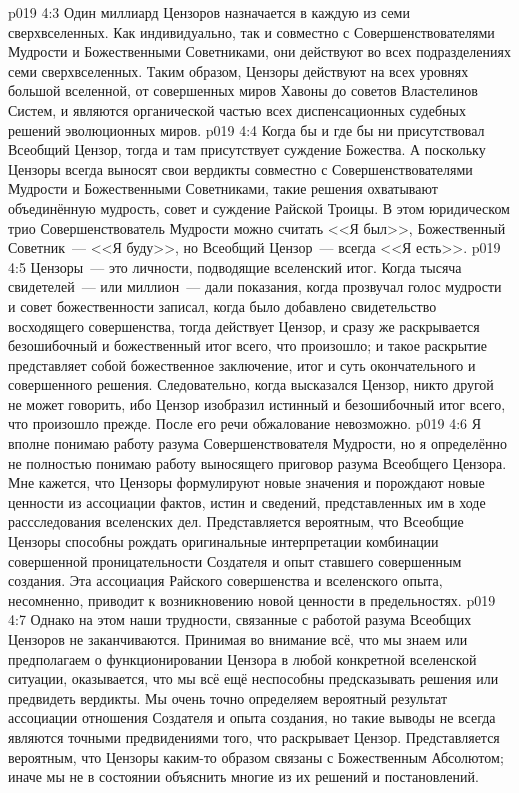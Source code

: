 \vs p019 4:3 Один миллиард Цензоров назначается в каждую из семи сверхвселенных. Как индивидуально, так и совместно с Совершенствователями Мудрости и Божественными Советниками, они действуют во всех подразделениях семи сверхвселенных. Таким образом, Цензоры действуют на всех уровнях большой вселенной, от совершенных миров Хавоны до советов Властелинов Систем, и являются органической частью всех диспенсационных судебных решений эволюционных миров.
\vs p019 4:4 \pc Когда бы и где бы ни присутствовал Всеобщий Цензор, тогда и там присутствует суждение Божества. А поскольку Цензоры всегда выносят свои вердикты совместно с Совершенствователями Мудрости и Божественными Советниками, такие решения охватывают объединённую мудрость, совет и суждение Райской Троицы. В этом юридическом трио Совершенствователь Мудрости можно считать <<Я был>>, Божественный Советник~--- <<Я буду>>, но Всеобщий Цензор~--- всегда <<Я есть>>.
\vs p019 4:5 \pc Цензоры~--- это личности, подводящие вселенский итог. Когда тысяча свидетелей~--- или миллион~--- дали показания, когда прозвучал голос мудрости и совет божественности записал, когда было добавлено свидетельство восходящего совершенства, тогда действует Цензор, и сразу же раскрывается безошибочный и божественный итог всего, что произошло; и такое раскрытие представляет собой божественное заключение, итог и суть окончательного и совершенного решения. Следовательно, когда высказался Цензор, никто другой не может говорить, ибо Цензор изобразил истинный и безошибочный итог всего, что произошло прежде. После его речи обжалование невозможно.
\vs p019 4:6 Я вполне понимаю работу разума Совершенствователя Мудрости, но я определённо не полностью понимаю работу выносящего приговор разума Всеобщего Цензора. Мне кажется, что Цензоры формулируют новые значения и порождают новые ценности из ассоциации фактов, истин и сведений, представленных им в ходе рассследования вселенских дел. Представляется вероятным, что Всеобщие Цензоры способны рождать оригинальные интерпретации комбинации совершенной проницательности Создателя и опыт ставшего совершенным создания. Эта ассоциация Райского совершенства и вселенского опыта, несомненно, приводит к возникновению новой ценности в предельностях.
\vs p019 4:7 Однако на этом наши трудности, связанные с работой разума Всеобщих Цензоров не заканчиваются. Принимая во внимание всё,  что мы знаем или предполагаем о функционировании Цензора в любой конкретной вселенской ситуации, оказывается, что мы всё ещё неспособны предсказывать решения или предвидеть вердикты. Мы очень точно определяем вероятный результат ассоциации отношения Создателя и опыта создания, но такие выводы не всегда являются точными предвидениями того, что раскрывает Цензор. Представляется вероятным, что Цензоры каким\hyp{}то образом связаны с Божественным Абсолютом; иначе мы не в состоянии объяснить многие из их решений и постановлений.
